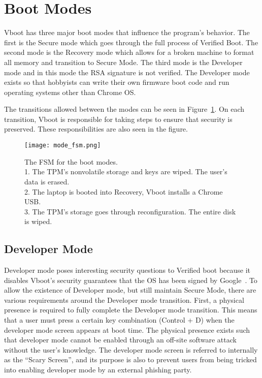 \section{Boot Modes}\label{sec:boot-modes}

Vboot has three major boot modes that influence the program's behavior.
The first is the Secure mode which goes through the full process of Verified Boot.
The second mode is the Recovery mode which allows for a broken machine to
format all memory and transition to Secure Mode.
The third mode is the Developer mode and in this mode the RSA signature is not verified.
The Developer mode exists so that hobbyists can write their own firmware boot code and run operating systems other than Chrome OS\@.

The transitions allowed between the modes can be seen in
Figure~\ref{fig:mode_fsm}.
On each transition, Vboot is responsible for taking steps to ensure that
security is preserved. 
These responsibilities are also seen in the figure.

\begin{figure}
  \centering
  \texttt{[image: mode\_fsm.png]}
  \caption[Vboot Boot Mode FSM]{The FSM for the boot modes. \\
  1. The TPM's nonvolatile storage and keys are wiped. The user's data
  is erased. \\
  2. The laptop is booted into Recovery, Vboot installs a Chrome USB.
  \\
  3. The TPM's storage goes through reconfiguration. The entire disk is wiped.
  \\}\label{fig:mode_fsm}
\end{figure}

\subsection{Developer Mode}

Developer mode poses interesting security questions to Verified boot because it
disables Vboot's security guarantees that the OS has been signed by Google~\cite{developer-mode}. 
To allow the existence of Developer mode, but still maintain 
Secure Mode, there are various requirements around the Developer mode transition.
First, a physical presence is required to fully complete the Developer mode transition. 
This means that a user must press a certain key combination (Control + D) when
the developer mode screen appears at boot time.
The physical presence exists such that developer mode cannot be enabled through an off-site software attack without the user's knowledge.
The developer mode screen is referred to internally as the ``Scary Screen'', and its purpose is also to prevent users from being tricked into enabling developer mode by an external phishing party.

